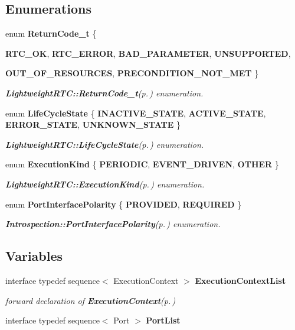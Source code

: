 \subsection*{Enumerations}
\begin{CompactItemize}
\item 
enum {\bf Return\-Code\_\-t} \{ \par
{\bf RTC\_\-OK}, 
{\bf RTC\_\-ERROR}, 
{\bf BAD\_\-PARAMETER}, 
{\bf UNSUPPORTED}, 
\par
{\bf OUT\_\-OF\_\-RESOURCES}, 
{\bf PRECONDITION\_\-NOT\_\-MET}
 \}
\begin{CompactList}\small\item\em {\bf Lightweight\-RTC::Return\-Code\_\-t}{\rm (p.\,\pageref{namespaceRTC_a28})} enumeration. \item\end{CompactList}\item 
enum {\bf Life\-Cycle\-State} \{ {\bf INACTIVE\_\-STATE}, 
{\bf ACTIVE\_\-STATE}, 
{\bf ERROR\_\-STATE}, 
{\bf UNKNOWN\_\-STATE}
 \}
\begin{CompactList}\small\item\em {\bf Lightweight\-RTC::Life\-Cycle\-State}{\rm (p.\,\pageref{namespaceRTC_a29})} enumeration. \item\end{CompactList}\item 
enum {\bf Execution\-Kind} \{ {\bf PERIODIC}, 
{\bf EVENT\_\-DRIVEN}, 
{\bf OTHER}
 \}
\begin{CompactList}\small\item\em {\bf Lightweight\-RTC::Execution\-Kind}{\rm (p.\,\pageref{namespaceRTC_a30})} enumeration. \item\end{CompactList}\item 
enum {\bf Port\-Interface\-Polarity} \{ {\bf PROVIDED}, 
{\bf REQUIRED}
 \}
\begin{CompactList}\small\item\em {\bf Introspection::Port\-Interface\-Polarity}{\rm (p.\,\pageref{namespaceRTC_a31})} enumeration. \item\end{CompactList}\end{CompactItemize}
\subsection*{Variables}
\begin{CompactItemize}
\item 
interface typedef sequence$<$ Execution\-Context $>$ {\bf Execution\-Context\-List}
\begin{CompactList}\small\item\em forward declaration of {\bf Execution\-Context}{\rm (p.\,\pageref{interfaceRTC_1_1ExecutionContext})} \item\end{CompactList}\item 
interface typedef sequence$<$ Port $>$ {\bf Port\-List}
\end{CompactItemize}


